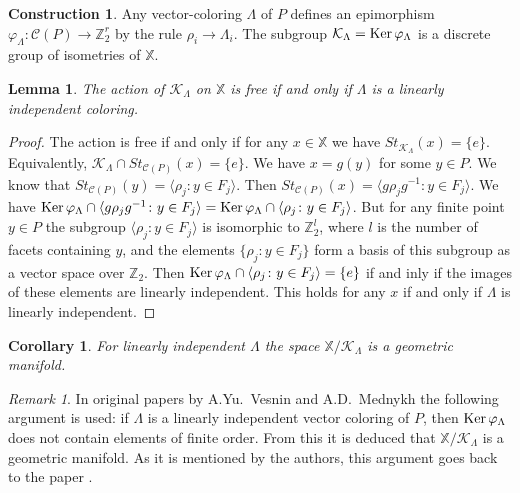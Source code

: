 \documentclass[12pt]{amsart}
\newtheorem{corollary}[formula]{Corollary}
\newtheorem{lemma}[formula]{Lemma}
\theoremstyle{definition}
\newtheorem{construction}[formula]{Construction}
\theoremstyle{remark}
\newtheorem{remark}[formula]{Remark}
\begin{document}
\begin{construction}
Any vector-coloring  $\Lambda$ of $P$ defines an epimorphism $\varphi_\Lambda\colon\mathcal{C}(P)\to\mathbb Z_2^r$
by the rule $\rho_i\to \Lambda_i$. 
The subgroup $\mathcal{K}_{\Lambda}={\rm Ker}\,\varphi_\Lambda$ is a discrete group of isometries of $\mathbb X$. 
\begin{lemma}
The action of $\mathcal{K}_{\Lambda}$ on $\mathbb X$ is free if and only if $\Lambda$ is a linearly independent coloring.
\end{lemma}
\begin{proof}
The action is free if and only if for any $x\in \mathbb X$ we have $St_{\mathcal{K}_{\Lambda}}(x)=\{e\}$. Equivalently,
$\mathcal{K}_{\Lambda}\cap St_{\mathcal{C}(P)}(x)=\{e\}$. We have $x=g(y)$ for some $y\in P$. We know that
$St_{\mathcal{C}(P)}(y)=\langle\rho_j\colon y\in F_j\rangle$. Then 
$St_{\mathcal{C}(P)}(x)=\langle g\rho_jg^{-1}\colon y\in F_j\rangle$. We have 
${\rm Ker}\,\varphi_\Lambda\cap \langle g\rho_jg^{-1}\colon y\in F_j\rangle=
{\rm Ker}\,\varphi_\Lambda\cap \langle\rho_j\colon y\in F_j\rangle$. But for any finite point $y\in P$ the subgroup  
$\langle\rho_j\colon y\in F_j\rangle$ is isomorphic to $\mathbb Z_2^l$, where 
$l$ is the number of facets containing $y$, and the elements $\{\rho_j\colon y\in F_j\}$ 
form a basis of this subgroup as a vector space
over $\mathbb Z_2$. Then ${\rm Ker}\,\varphi_\Lambda\cap \langle\rho_j\colon y\in F_j\rangle=\{e\}$ if and inly if the images
of these elements are linearly independent. This holds for any $x$ if and only if  $\Lambda$ is linearly independent.
\end{proof}
\begin{corollary}
For linearly independent $\Lambda$ the space $\mathbb X/\mathcal{K}_{\Lambda}$ is a geometric manifold. 
\end{corollary}
\begin{remark}
In original papers by A.Yu.~Vesnin and A.D.~Mednykh the following argument is used: if $\Lambda$ is a linearly independent 
vector coloring of $P$, then ${\rm Ker}\,\varphi_\Lambda$ does not contain elements of finite order. From this it is deduced 
that  $\mathbb X/\mathcal{K}_{\Lambda}$ is a geometric manifold. As it is mentioned by the authors, this argument goes back to the paper \cite{A80}.
\end{remark}


\end{construction}
\end{document}
